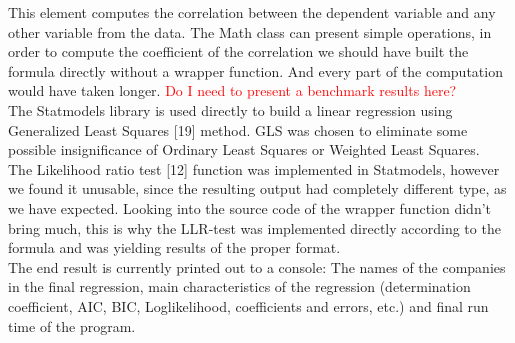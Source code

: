 \documentclass{article}
\begin{document}
This element computes the correlation between the dependent variable and any other variable from the data. The Math class can present simple operations, in order to compute the coefficient of the correlation we should have built the formula directly without a wrapper function. And every part of the computation would have taken longer. \textcolor{red}{Do I need to present a benchmark results here?}\\
The Statmodels library is used directly to build a linear regression using Generalized Least Squares [19] method. GLS was chosen to eliminate some possible insignificance of Ordinary Least Squares or Weighted Least Squares.\\
The Likelihood ratio test [12] function was implemented in Statmodels, however we found it unusable, since the resulting output had completely different type, as we have expected. Looking into the source code of the wrapper function didn't bring much, this is why the LLR-test was implemented directly according to the formula and was yielding results of the proper format.\\
The end result is currently printed out to a console: The names of the companies in the final regression, main characteristics of the regression (determination coefficient, AIC, BIC, Loglikelihood, coefficients and errors, etc.) and final run time of the program. 
\end{document}
